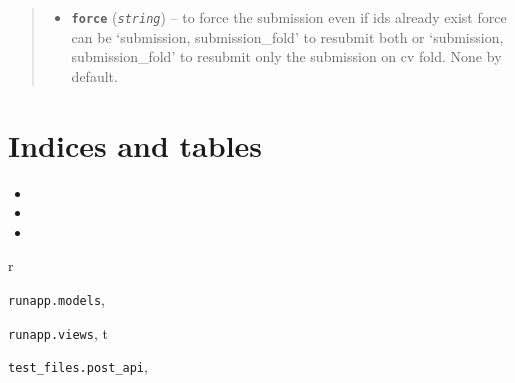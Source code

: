 \documentclass[letterpaper,10pt,english]{sphinxmanual}
\begin{document}
\begin{fulllineitems}
\begin{quote}
\begin{description}
\begin{itemize}
\item {} 
\textbf{\texttt{force}} (\emph{\texttt{string}}) -- to force the submission even if ids already exist        force can be `submission, submission\_fold' to resubmit both        or `submission, submission\_fold' to resubmit only the submission        on cv fold. None by default.

\end{itemize}

\end{description}\end{quote}

\end{fulllineitems}



\chapter{Indices and tables}
\label{index:indices-and-tables}\begin{itemize}
\item {} 

\item {} 

\item {} 

\end{itemize}


\renewcommand{\indexname}{Python Module Index}
\begin{theindex}
\def\bigletter#1{{\Large\sffamily#1}\nopagebreak\vspace{1mm}}
\bigletter{r}
\item {\texttt{runapp.models}}, \pageref{modules/models:module-runapp.models}
\item {\texttt{runapp.views}}, \pageref{modules/views:module-runapp.views}
\indexspace
\bigletter{t}
\item {\texttt{test\_files.post\_api}}, \pageref{modules/views:module-test_files.post_api}
\end{theindex}

\renewcommand{\indexname}{Index}
\printindex
\end{document}
